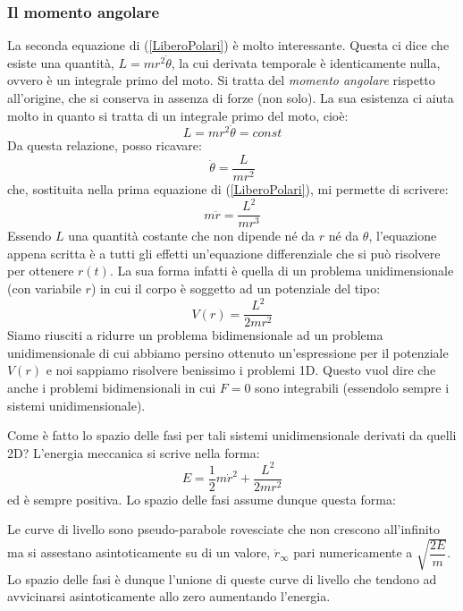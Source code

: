 \documentclass[a4paper,openany]{article}
\begin{document}
	\subsubsection{Il momento angolare}
	La seconda equazione di (\ref{LiberoPolari}) è molto interessante. Questa ci dice che esiste una quantità, $L = mr^{2}\dot{\theta}$, la cui derivata temporale è identicamente nulla, ovvero è un integrale primo del moto. Si tratta del \textit{momento angolare} rispetto all'origine, che si conserva in assenza di forze (non solo). La sua esistenza ci aiuta molto in quanto si tratta di un integrale primo del moto, cioè:
	$$
	L = mr^{2}\dot{\theta} = const
	$$
	Da questa relazione, posso ricavare:
	$$
	\dot{\theta} = \dfrac{L}{mr^{2}}
	$$
	che, sostituita nella prima equazione di (\ref{LiberoPolari}), mi permette di scrivere:
	\begin{equation}
		m\ddot{r} = \dfrac{L^{2}}{mr^{3}}
	\end{equation}
	Essendo $L$ una quantità costante che non dipende né da $r$ né da $\theta$, l'equazione appena scritta è a tutti gli effetti un'equazione differenziale che si può risolvere per ottenere $r(t)$. La sua forma infatti è quella di un problema unidimensionale (con variabile $r$) in cui il corpo è soggetto ad un potenziale del tipo:
	\begin{equation}
		V(r) = \dfrac{L^{2}}{2mr^{2}}
	\end{equation}
	Siamo riusciti a ridurre un problema bidimensionale ad un problema unidimensionale di cui abbiamo persino ottenuto un'espressione per il potenziale $V(r)$ e noi sappiamo risolvere benissimo i problemi 1D. Questo vuol dire che anche i problemi bidimensionali in cui $F=0$ sono integrabili (essendolo sempre i sistemi unidimensionale).
	
	Come è fatto lo spazio delle fasi per tali sistemi unidimensionale derivati da quelli 2D? L'energia meccanica si scrive nella forma:
	\begin{equation}
		E = \dfrac{1}{2}m\dot{r}^{2} + \dfrac{L^{2}}{2mr^{2}}
	\end{equation}
	ed è sempre positiva. Lo spazio delle fasi assume dunque questa forma:
	\begin{figure}[H]
		\centering
	\end{figure}
	Le curve di livello sono pseudo-parabole rovesciate che non crescono all'infinito ma si assestano asintoticamente su di un valore, $\dot{r}_{\infty}$ pari numericamente a $\sqrt{\dfrac{2E}{m}}$. Lo spazio delle fasi è dunque l'unione di queste curve di livello che tendono ad avvicinarsi asintoticamente allo zero aumentando l'energia.
\end{document}
